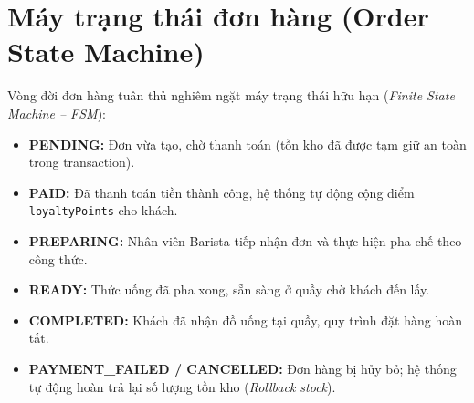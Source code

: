 \documentclass[12pt,a4paper]{article}
\begin{document}
\section{Máy trạng thái đơn hàng (Order State Machine)}
Vòng đời đơn hàng tuân thủ nghiêm ngặt máy trạng thái hữu hạn (\textit{Finite State Machine -- FSM}):

\begin{center}
\small
{}
\end{center}

\begin{itemize}[leftmargin=*,itemsep=1.5pt]
    \item \textbf{PENDING:} Đơn vừa tạo, chờ thanh toán (tồn kho đã được tạm giữ an toàn trong transaction).
    \item \textbf{PAID:} Đã thanh toán tiền thành công, hệ thống tự động cộng điểm \texttt{loyaltyPoints} cho khách.
    \item \textbf{PREPARING:} Nhân viên Barista tiếp nhận đơn và thực hiện pha chế theo công thức.
    \item \textbf{READY:} Thức uống đã pha xong, sẵn sàng ở quầy chờ khách đến lấy.
    \item \textbf{COMPLETED:} Khách đã nhận đồ uống tại quầy, quy trình đặt hàng hoàn tất.
    \item \textbf{PAYMENT\_FAILED / CANCELLED:} Đơn hàng bị hủy bỏ; hệ thống tự động hoàn trả lại số lượng tồn kho (\textit{Rollback stock}).
\end{itemize}
\end{document}
